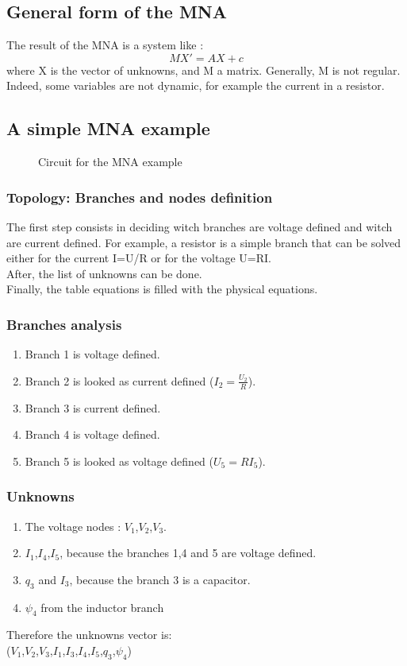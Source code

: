 \subsection{General form of the MNA}
The result of the MNA is a system like :
\[MX'=AX+c\]
where X is the vector of unknowns, and M a matrix. Generally, M is not regular. Indeed, some variables
are not dynamic, for example the current in a resistor.
\newpage
\subsection{A simple MNA example}
\begin{figure}[h]
\centerline{
 \scalebox{0.6}{
    
 }
}
\caption{Circuit for the MNA example}
\label{fig-MNA-example}
\end{figure}
\subsubsection{Topology: Branches and nodes definition}
The first step consists in deciding witch branches are voltage defined and witch are current
defined. For example, a resistor is a simple branch that can be solved either for the current I=U/R or for the
voltage U=RI. \\
After, the list of unknowns can be done. \\
Finally, the table equations is filled with the physical equations. 

\subsubsection{Branches analysis}

\begin{enumerate}
\item Branch 1 is voltage defined.
\item Branch 2 is looked as current defined ($I_{2}=\frac{U_{2}}{R}$).
\item Branch 3 is current defined.
\item Branch 4 is voltage defined.
\item Branch 5 is looked as voltage defined ($U_{5}=RI_{5}$).
\end{enumerate}
\subsubsection{Unknowns}
\begin{enumerate}
\item The voltage nodes : $V_{1}$,$V_{2}$,$V_{3}$.
\item $I_{1}$,$I_{4}$,$I_{5}$, because the branches 1,4 and 5 are voltage defined.
\item $q_{3}$ and $I_{3}$, because the branch 3 is a capacitor.
\item $\psi _{4}$ from the inductor branch
\end{enumerate}
Therefore the unknowns vector is:\\
($V_{1}$,$V_{2}$,$V_{3}$,$I_{1}$,$I_{3}$,$I_{4}$,$I_{5}$,$q_{3}$,$\psi _{4}$)
